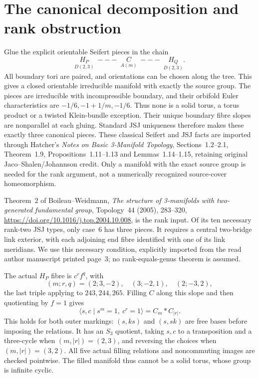 \documentclass[11pt]{article}
\begin{document}
\section{The canonical decomposition and rank obstruction}

Glue the explicit orientable Seifert pieces in the chain
\[
 \underset{D(2,3)}{H_P}\;---\;
 \underset{A(m)}{C}\;---\;
 \underset{D(2,3)}{H_Q}.
\]
All boundary tori are paired, and orientations can be chosen along the
tree. This gives a closed orientable irreducible manifold with exactly
the source group. The pieces are irreducible with incompressible
boundary, and their orbifold Euler characteristics are $-1/6,-1+1/m,-1/6$.
Thus none is a solid torus, a torus product or a twisted Klein-bundle
exception. Their unique boundary fibre slopes are nonparallel at each
gluing. Standard JSJ uniqueness therefore makes these exactly three
canonical pieces. These classical Seifert and JSJ facts are imported
through Hatcher's \emph{Notes on Basic 3-Manifold Topology},
Sections~1.2--2.1, Theorem~1.9, Propositions~1.11--1.13 and
Lemmas~1.14--1.15, retaining original Jaco--Shalen/Johannson credit.
Only a manifold with the exact source group is needed for the rank
argument, not a numerically recognized source-cover homeomorphism.

Theorem~2 of Boileau--Weidmann, \emph{The structure of 3-manifolds with
two-generated fundamental group}, Topology~44 (2005), 283--320,
\url{https://doi.org/10.1016/j.top.2004.10.008}, is the rank input.
Of its ten necessary rank-two JSJ types, only case~6 has three pieces.
It requires a central two-bridge link exterior, with each adjoining
end fibre identified with one of its link meridians. We use this
necessary condition, explicitly imported from the read author manuscript
printed page~3; no rank-equals-genus theorem is assumed.

The actual $H_P$ fibre is $c^rf^q$, with
\[
 (m;r,q)=(2;3,-2),\quad(3;-2,1),\quad(2;-3,2),
\]
the last triple applying to $243,244,265$. Filling $C$ along this slope
and then quotienting by $f=1$ gives
\[
 \langle s,c\mid s^m=1,\ c^r=1\rangle=C_m*C_{|r|}.
\]
This holds for both outer markings: $(s,ks)$ and $(s,sk)$ are free bases
before imposing the relations. It has an $S_3$ quotient, taking $s,c$
to a transposition and a three-cycle when $(m,|r|)=(2,3)$, and reversing
the choices when $(m,|r|)=(3,2)$. All five actual filling relations and
noncommuting images are checked pointwise. The filled manifold thus
cannot be a solid torus, whose group is infinite cyclic.
\end{document}
